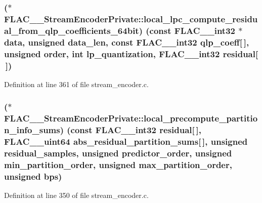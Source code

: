 \subsubsection[{\texorpdfstring{local\+\_\+lpc\+\_\+compute\+\_\+residual\+\_\+from\+\_\+qlp\+\_\+coefficients\+\_\+64bit}{local_lpc_compute_residual_from_qlp_coefficients_64bit}}]{($\ast$ F\+L\+A\+C\+\_\+\+\_\+\+Stream\+Encoder\+Private\+::local\+\_\+lpc\+\_\+compute\+\_\+residual\+\_\+from\+\_\+qlp\+\_\+coefficients\+\_\+64bit) ({\bf const} {\bf F\+L\+A\+C\+\_\+\+\_\+int32} $\ast${\bf data}, unsigned data\+\_\+len, {\bf const} {\bf F\+L\+A\+C\+\_\+\+\_\+int32} qlp\+\_\+coeff\mbox{[}$\,$\mbox{]}, unsigned {\bf order}, {\bf int} lp\+\_\+quantization, {\bf F\+L\+A\+C\+\_\+\+\_\+int32} residual\mbox{[}$\,$\mbox{]})}\hypertarget{struct_f_l_a_c_____stream_encoder_private_a5ef2f31d9638f3ff8fc5c2bf765b3e01}{}\label{struct_f_l_a_c_____stream_encoder_private_a5ef2f31d9638f3ff8fc5c2bf765b3e01}


Definition at line 361 of file stream\+\_\+encoder.\+c.

\subsubsection[{\texorpdfstring{local\+\_\+precompute\+\_\+partition\+\_\+info\+\_\+sums}{local_precompute_partition_info_sums}}]{($\ast$ F\+L\+A\+C\+\_\+\+\_\+\+Stream\+Encoder\+Private\+::local\+\_\+precompute\+\_\+partition\+\_\+info\+\_\+sums) ({\bf const} {\bf F\+L\+A\+C\+\_\+\+\_\+int32} residual\mbox{[}$\,$\mbox{]}, {\bf F\+L\+A\+C\+\_\+\+\_\+uint64} {\bf abs\+\_\+residual\+\_\+partition\+\_\+sums}\mbox{[}$\,$\mbox{]}, unsigned residual\+\_\+samples, unsigned predictor\+\_\+order, unsigned min\+\_\+partition\+\_\+order, unsigned max\+\_\+partition\+\_\+order, unsigned bps)}\hypertarget{struct_f_l_a_c_____stream_encoder_private_adf035e322004872a812fbf48f3ad6ef7}{}\label{struct_f_l_a_c_____stream_encoder_private_adf035e322004872a812fbf48f3ad6ef7}


Definition at line 350 of file stream\+\_\+encoder.\+c.

